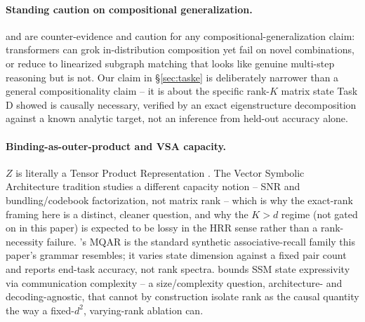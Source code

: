 \paragraph{Standing caution on compositional generalization.}
\citet{dziri2023faithfate} and \citet{wang2024grokked} are counter-evidence
and caution for any compositional-generalization claim: transformers can
grok in-distribution composition yet fail on novel combinations, or reduce
to linearized subgraph matching that looks like genuine multi-step
reasoning but is not. Our claim in \S\ref{sec:taske} is deliberately
narrower than a general compositionality claim -- it is about the specific
rank-$K$ matrix state Task D showed is causally necessary, verified by an
exact eigenstructure decomposition against a known analytic target, not an
inference from held-out accuracy alone.

\paragraph{Binding-as-outer-product and VSA capacity.} $Z$ is literally a
Tensor Product Representation \citep{smolensky1990tensor,mccoy2019tprs,
schlag2019tptransformer}. The Vector Symbolic Architecture tradition
\citep{plate1995hrr,frady2020resonator} studies a different capacity
notion -- SNR and bundling/codebook factorization, not matrix rank -- which
is why the exact-rank framing here is a distinct, cleaner question, and why
the $K>d$ regime (not gated on in this paper) is expected to be lossy in
the HRR sense rather than a rank-necessity failure. \citet{arora2023zoology}'s
MQAR is the standard synthetic associative-recall family this paper's
grammar resembles; it varies state dimension against a fixed pair count and
reports end-task accuracy, not rank spectra. \citet{merrill2024illusion}
bounds SSM state expressivity via communication complexity -- a
size/complexity question, architecture- and decoding-agnostic, that cannot
by construction isolate rank as the causal quantity the way a fixed-$d^2$,
varying-rank ablation can.
